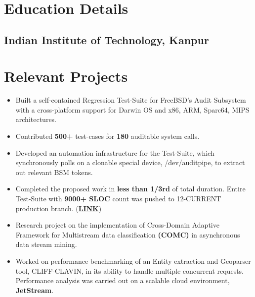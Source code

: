 \documentclass[10pt, margin=0.5in]{deedy-resume-openfont}
\begin{document}
\begin{minipage}[t]{0.47\textwidth}


\vspace{-8pt}
\section{Education Details}
\subsection{Indian Institute of Technology, Kanpur}

\section{Relevant Projects}
\begin{itemize}[leftmargin=*, noitemsep]
\item Built a self-contained Regression Test-Suite for FreeBSD's Audit Subsystem with a cross-platform support for Darwin OS and x86, ARM, Sparc64, MIPS architectures.
  \item Contributed \textbf{500+} test-cases for \textbf{180} auditable system calls.
  \item Developed an automation infrastructure for the Test-Suite, which synchronously polls on a clonable special device, /dev/auditpipe, to extract out relevant BSM tokens.
  \item	Completed the proposed work in \textbf{less than 1/3rd} of total duration. Entire Test-Suite with \textbf{9000+ SLOC} count was pushed to 12-CURRENT production branch. (\href{https://github.com/freebsd/freebsd/tree/master/tests/sys/audit}{\textbf{LINK}})
\end{itemize}

\vspace{5pt}

\begin{itemize}[leftmargin=*, noitemsep]
  \item Research project on the implementation of Cross-Domain Adaptive Framework for Multistream data classification \textbf{(COMC)} in asynchronous data stream mining.
  \item Worked on performance benchmarking of an Entity extraction and Geoparser tool, CLIFF-CLAVIN, in its ability to handle multiple concurrent requests. Performance analysis was carried out on a scalable cloud environment, \textbf{JetStream}.
\end{itemize}


\end{minipage}
\end{document}
